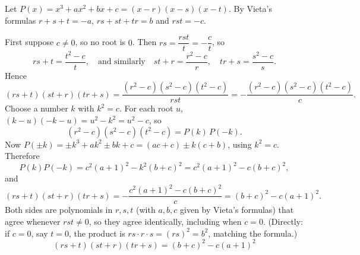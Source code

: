 Let \(P(x)=x^3+ax^2+bx+c=(x-r)(x-s)(x-t)\). By Vieta's formulas \(r+s+t=-a\), \(rs+st+tr=b\) and \(rst=-c\).

First suppose \(c\ne 0\), so no root is \(0\). Then \(rs=\dfrac{rst}{t}=-\dfrac{c}{t}\), so
\[
rs+t=\dfrac{t^2-c}{t},\quad\text{and similarly}\quad st+r=\dfrac{r^2-c}{r},\quad tr+s=\dfrac{s^2-c}{s}.
\]
Hence
\[
(rs+t)(st+r)(tr+s)=\dfrac{(r^2-c)(s^2-c)(t^2-c)}{rst}=-\dfrac{(r^2-c)(s^2-c)(t^2-c)}{c}.
\]
Choose a number \(k\) with \(k^2=c\). For each root \(u\), \((k-u)(-k-u)=u^2-k^2=u^2-c\), so
\[
(r^2-c)(s^2-c)(t^2-c)=P(k)\,P(-k).
\]
Now \(P(\pm k)=\pm k^3+ak^2\pm bk+c=(ac+c)\pm k(c+b)\), using \(k^2=c\). Therefore
\[
P(k)P(-k)=c^2(a+1)^2-k^2(b+c)^2=c^2(a+1)^2-c(b+c)^2,
\]
and
\[
(rs+t)(st+r)(tr+s)=-\dfrac{c^2(a+1)^2-c(b+c)^2}{c}=(b+c)^2-c(a+1)^2.
\]
Both sides are polynomials in \(r,s,t\) (with \(a,b,c\) given by Vieta's formulas) that agree whenever \(rst\ne 0\), so they agree identically, including when \(c=0\). (Directly: if \(c=0\), say \(t=0\), the product is \(rs\cdot r\cdot s=(rs)^2=b^2\), matching the formula.)
\[
\boxed{(rs+t)(st+r)(tr+s)=(b+c)^2-c(a+1)^2}
\]
